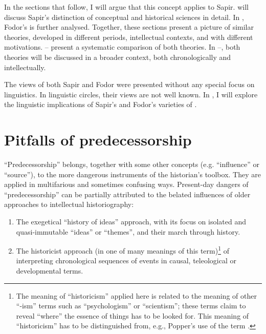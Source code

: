 \documentclass[output=paper]{langscibook}
\begin{document}
In the sections that follow, I will argue that this concept applies to Sapir.  will discuss Sapir's distinction of conceptual and historical sciences in detail. In , Fodor's  is further analysed. Together, these sections present a picture of similar theories, developed in different periods, intellectual contexts, and with different motivations. -- present a systematic comparison of both theories. In --, both theories will be discussed in a broader context, both chronologically and intellectually. 

The views of both Sapir and Fodor were presented without any special focus on linguistics. In linguistic circles, their views are not well known. In , I will explore the linguistic implications of Sapir's and Fodor's varieties of .

\largerpage
\section{Pitfalls of predecessorship}
\label{sec:elffers:pitfalls}

``Predecessorship'' belongs, together with some other concepts (e.g. ``influence'' or ``source''), to the more dangerous instruments of the historian's toolbox. They are applied in multifarious and sometimes confusing ways. Present-day dangers of ``predecessorship'' can be partially attributed to the belated influences of older approaches to intellectual historiography:

\begin{enumerate}
    \item The exegetical ``history of ideas'' approach, with its focus on isolated and quasi-immutable ``ideas'' or ``themes'', and their march through history.
    \item The historicist approach (in one of many meanings of this term)\footnote{The meaning of ``historicism'' applied here is related to the meaning of other ``-ism'' terms such as ``psychologism'' or ``scientism''; these terms claim to reveal ``where'' the essence of things has to be looked for. This meaning of ``historicism'' has to be distinguished from, e.g., Popper's use of the term \citep[cf.][43]{Elffers1991}.} of interpreting chronological sequences of events in causal, teleological or developmental terms.
\end{enumerate}
\end{document}
